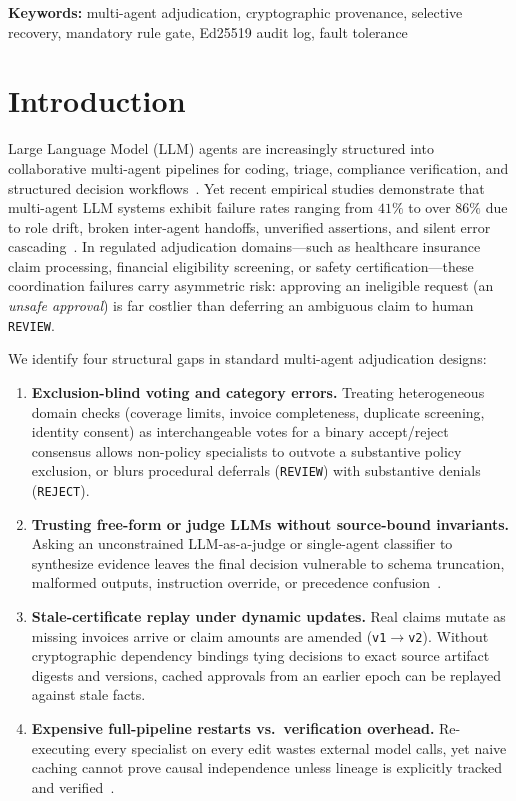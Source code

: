 \documentclass[11pt,a4paper]{article}
\begin{document}
\textbf{Keywords:} multi-agent adjudication, cryptographic provenance, selective recovery, mandatory rule gate, Ed25519 audit log, fault tolerance

\section{Introduction}
Large Language Model (LLM) agents are increasingly structured into collaborative multi-agent pipelines for coding, triage, compliance verification, and structured decision workflows~\citep{wu2023autogen,hong2024metagpt,du2024debate}. Yet recent empirical studies demonstrate that multi-agent LLM systems exhibit failure rates ranging from $41\%$ to over $86\%$ due to role drift, broken inter-agent handoffs, unverified assertions, and silent error cascading~\citep{cemri2025mast}. In regulated adjudication domains---such as healthcare insurance claim processing, financial eligibility screening, or safety certification---these coordination failures carry asymmetric risk: approving an ineligible request (an \emph{unsafe approval}) is far costlier than deferring an ambiguous claim to human \texttt{REVIEW}.

We identify four structural gaps in standard multi-agent adjudication designs:
\begin{enumerate}[leftmargin=*,itemsep=2pt]
    \item \textbf{Exclusion-blind voting and category errors.} Treating heterogeneous domain checks (coverage limits, invoice completeness, duplicate screening, identity consent) as interchangeable votes for a binary accept/reject consensus allows non-policy specialists to outvote a substantive policy exclusion, or blurs procedural deferrals (\texttt{REVIEW}) with substantive denials (\texttt{REJECT}).
    \item \textbf{Trusting free-form or judge LLMs without source-bound invariants.} Asking an unconstrained LLM-as-a-judge or single-agent classifier to synthesize evidence leaves the final decision vulnerable to schema truncation, malformed outputs, instruction override, or precedence confusion~\citep{zheng2023judge}.
    \item \textbf{Stale-certificate replay under dynamic updates.} Real claims mutate as missing invoices arrive or claim amounts are amended (\texttt{v1}$\rightarrow$\texttt{v2}). Without cryptographic dependency bindings tying decisions to exact source artifact digests and versions, cached approvals from an earlier epoch can be replayed against stale facts.
    \item \textbf{Expensive full-pipeline restarts vs.\ verification overhead.} Re-executing every specialist on every edit wastes external model calls, yet naive caching cannot prove causal independence unless lineage is explicitly tracked and verified~\citep{mokhov2018build,moreau2013prov}.
\end{enumerate}
\end{document}
